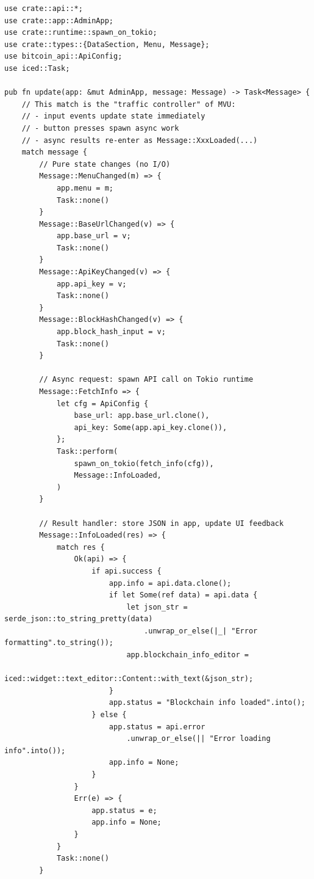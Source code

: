 \begin{listing}[H]
\caption{Update loop (excerpt) ()}
\label{lst:ch16-update}
\begin{verbatim}
use crate::api::*;
use crate::app::AdminApp;
use crate::runtime::spawn_on_tokio;
use crate::types::{DataSection, Menu, Message};
use bitcoin_api::ApiConfig;
use iced::Task;

pub fn update(app: &mut AdminApp, message: Message) -> Task<Message> {
    // This match is the "traffic controller" of MVU:
    // - input events update state immediately
    // - button presses spawn async work
    // - async results re-enter as Message::XxxLoaded(...)
    match message {
        // Pure state changes (no I/O)
        Message::MenuChanged(m) => {
            app.menu = m;
            Task::none()
        }
        Message::BaseUrlChanged(v) => {
            app.base_url = v;
            Task::none()
        }
        Message::ApiKeyChanged(v) => {
            app.api_key = v;
            Task::none()
        }
        Message::BlockHashChanged(v) => {
            app.block_hash_input = v;
            Task::none()
        }

        // Async request: spawn API call on Tokio runtime
        Message::FetchInfo => {
            let cfg = ApiConfig {
                base_url: app.base_url.clone(),
                api_key: Some(app.api_key.clone()),
            };
            Task::perform(
                spawn_on_tokio(fetch_info(cfg)),
                Message::InfoLoaded,
            )
        }

        // Result handler: store JSON in app, update UI feedback
        Message::InfoLoaded(res) => {
            match res {
                Ok(api) => {
                    if api.success {
                        app.info = api.data.clone();
                        if let Some(ref data) = api.data {
                            let json_str = serde_json::to_string_pretty(data)
                                .unwrap_or_else(|_| "Error formatting".to_string());
                            app.blockchain_info_editor =
                                iced::widget::text_editor::Content::with_text(&json_str);
                        }
                        app.status = "Blockchain info loaded".into();
                    } else {
                        app.status = api.error
                            .unwrap_or_else(|| "Error loading info".into());
                        app.info = None;
                    }
                }
                Err(e) => {
                    app.status = e;
                    app.info = None;
                }
            }
            Task::none()
        }


\end{verbatim}
\end{listing}
